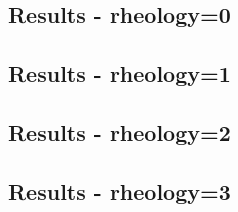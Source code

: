 \newpage
\subsection*{Results - rheology=0}


\newpage
\subsection*{Results - rheology=1}


\newpage
\subsection*{Results - rheology=2}

\newpage
\subsection*{Results - rheology=3}


